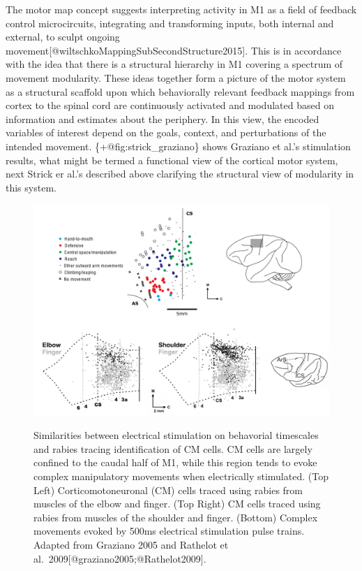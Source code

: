 \documentclass[../main.tex]{subfiles}
\begin{document}
{{{The motor map concept suggests interpreting activity in M1 as a field of
feedback control microcircuits, integrating and transforming inputs,
both internal and external, to sculpt ongoing
movement{[}@wiltschkoMappingSubSecondStructure2015{]}. This is in
accordance with the idea that there is a structural hierarchy in M1
covering a spectrum of movement modularity. These ideas together form a
picture of the motor system as a structural scaffold upon which
behaviorally relevant feedback mappings from cortex to the spinal cord
are continuously activated and modulated based on information and
estimates about the periphery. In this view, the encoded variables of
interest depend on the goals, context, and perturbations of the intended
movement. \{+@fig:strick\_graziano\} shows Graziano et al.'s stimulation
results, what might be termed a functional view of the cortical motor
system, next Strick er al.'s described above clarifying the structural
view of modularity in this system.

\begin{figure}
\label{fig:strick_graziano}
\centering
\includegraphics[width=1\textwidth,height=\textheight]{images/physiology/strick_graziano/strick_graziano.pdf}
\caption{Similarities between electrical stimulation on behavorial
timescales and rabies tracing identification of CM cells. CM cells are
largely confined to the caudal half of M1, while this region tends to
evoke complex manipulatory movements when electrically stimulated. (Top
Left) Corticomotoneuronal (CM) cells traced using rabies from muscles of
the elbow and finger. (Top Right) CM cells traced using rabies from
muscles of the shoulder and finger. (Bottom) Complex movements evoked by
500ms electrical stimulation pulse trains. Adapted from Graziano 2005
and Rathelot et
al.~2009{[}@graziano2005;@Rathelot2009{]}.}\label{fig:strick_graziano}
\end{figure}

}}}
\end{document}
